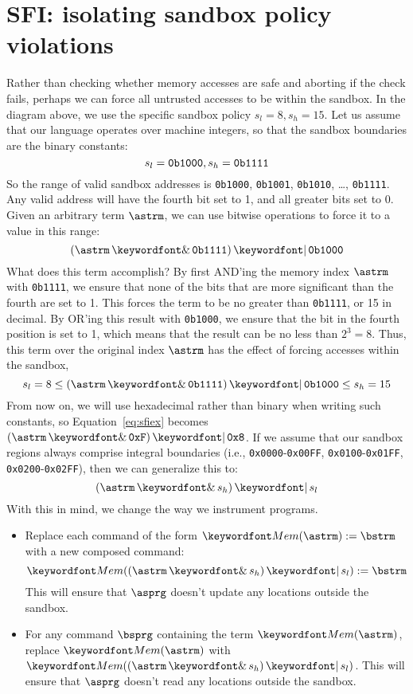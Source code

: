 \documentclass[11pt,twoside]{scrartcl}
\begin{document}
\section{SFI: isolating sandbox policy violations}
Rather than checking whether memory accesses are safe and aborting if the check fails, perhaps we can force all untrusted accesses to be within the sandbox. In the diagram above, we use the specific sandbox policy $s_l=8, s_h=15$. Let us assume that our language operates over machine integers, so that the sandbox boundaries are the binary constants:
\[
s_l = \verb'0b1000', s_h = \verb'0b1111'
\]
So the range of valid sandbox addresses is \verb'0b1000', \verb'0b1001', \verb'0b1010', \ldots, \verb'0b1111'. 
Any valid address will have the fourth bit set to 1, and all greater bits set to 0. Given an arbitrary term $\astrm$, we can use bitwise operations to force it to a value in this range:
\begin{equation}
\label{eq:sfiex}
(\astrm \bitand \verb'0b1111') \bitor \verb'0b1000'
\end{equation}
What does this term accomplish? By first AND'ing the memory index $\astrm$ with \verb'0b1111', we ensure that none of the bits that are more significant than the fourth are set to 1.
This forces the term to be no greater than \verb'0b1111', or 15 in decimal.
By OR'ing this result with \verb'0b1000', we ensure that the bit in the fourth position is set to 1, which means that the result can be no less than $2^3 = 8$.
Thus, this term over the original index $\astrm$ has the effect of forcing accesses within the sandbox, 
\[
s_l = 8 \le (\astrm \bitand \verb'0b1111') \bitor \verb'0b1000' \le s_h = 15
\]
From now on, we will use hexadecimal rather than binary when writing such constants, so Equation~\ref{eq:sfiex} becomes $(\astrm \bitand \verb'0xF') \bitor \verb'0x8'$. If we assume that our sandbox regions always comprise integral boundaries (i.e., \verb'0x0000'-\verb'0x00FF', \verb'0x0100'-\verb'0x01FF', \verb'0x0200'-\verb'0x02FF'), then we can generalize this to:
\begin{equation}
\label{eq:sfiex}
(\astrm \bitand s_h) \bitor s_l
\end{equation}
With this in mind, we change the way we instrument programs.
\begin{itemize}
  \item Replace each command of the form $\pderef{\astrm}:=\bstrm$ with a new composed command:
  \[
  \pderef{(\astrm \bitand s_h) \bitor s_l}:=\bstrm
  \]
  This will ensure that $\asprg$ doesn't update any locations outside the sandbox.

  \item For any command $\bsprg$ containing the term $\pderef{\astrm}$, replace $\pderef{\astrm}$ with $\pderef{(\astrm \bitand s_h) \bitor s_l}$.
  This will ensure that $\asprg$ doesn't read any locations outside the sandbox.
\end{itemize}
\end{document}
